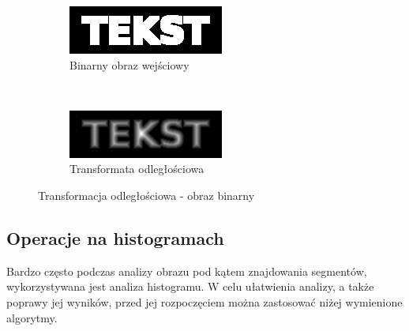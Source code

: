 \begin{figure}
  \centering
  \begin{subfigure}[b]{0.45\textwidth}
    \includegraphics[width=\textwidth]{img/distance-transform-before}
    \caption{Binarny obraz wejściowy}
    \label{fig:distance_transform_before}
  \end{subfigure}
  ~
  \begin{subfigure}[b]{0.45\textwidth}
    \includegraphics[width=\textwidth]{img/distance-transform-after}
    \caption{Transformata odległościowa}
    \label{fig:distance_transform_after}
  \end{subfigure}
    \caption{Transformacja odległościowa - obraz binarny}
    \label{fig:distance_transform}
\end{figure}

\subsection{Operacje na histogramach}
Bardzo często podczas analizy obrazu pod kątem znajdowania segmentów, wykorzystywana jest analiza histogramu. W celu ułatwienia analizy, a także poprawy jej wyników, przed jej rozpoczęciem można zastosować niżej wymienione algorytmy.
